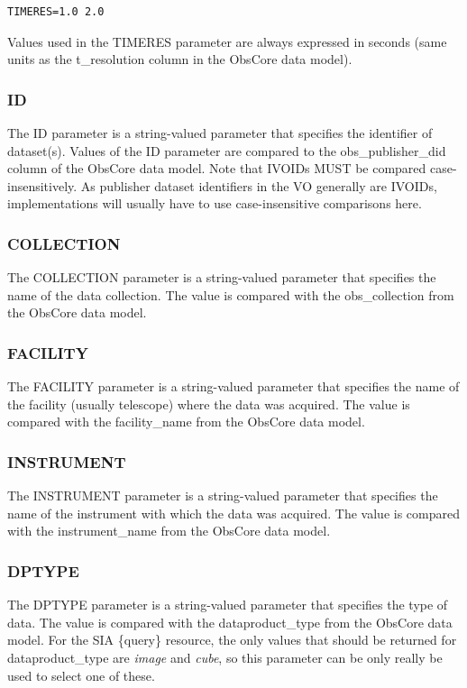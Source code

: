 \documentclass[11pt,a4paper]{ivoa}
\begin{document}
\begin{lstlisting}
TIMERES=1.0 2.0
\end{lstlisting}

Values used in the TIMERES parameter are always expressed in seconds (same units as the t\_resolution column in the ObsCore  data model).

\subsubsection{ID}
\label{sec:ID}
The ID parameter is a string-valued parameter that specifies the identifier of dataset(s). Values of the ID parameter are compared to the obs\_publisher\_did column of the ObsCore data model. Note that IVOIDs MUST be compared case-insensitively. As publisher dataset identifiers in the VO generally are IVOIDs, implementations will usually have to use case-insensitive comparisons here.

\subsubsection{COLLECTION}
The COLLECTION parameter is a string-valued parameter that specifies the name of the data collection. The value is compared with the obs\_collection from the ObsCore  data model.

\subsubsection{FACILITY}
The FACILITY parameter is a string-valued parameter that specifies the name of the facility (usually telescope) where the data was acquired. The value is compared with the facility\_name from the ObsCore data model.

\subsubsection{INSTRUMENT}
The INSTRUMENT parameter is a string-valued parameter that specifies the name of the instrument with which the data was acquired. The value is compared with the instrument\_name from the ObsCore data model.

\subsubsection{DPTYPE}
The DPTYPE parameter is a string-valued parameter that specifies the type of data. The value is compared with the dataproduct\_type from the ObsCore data model. For the SIA \{query\} resource, the only values that should be returned for dataproduct\_type are \textit{image} and \textit{cube}, so this parameter can be only really be used to select one of these.
\end{document}
